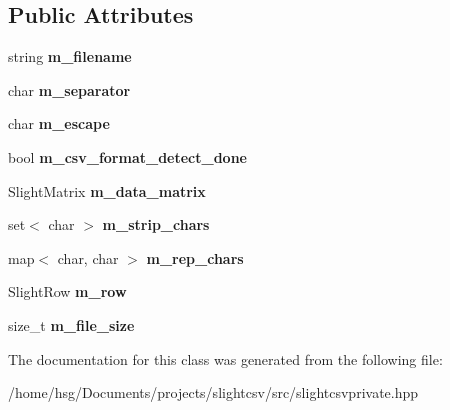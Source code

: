 \subsection*{Public Attributes}
\begin{DoxyCompactItemize}
\item 
\mbox{\label{classutils_1_1SlightCSVPrivate_a1ca95cf105a198d5198d201d6b5593fe}} 
string {\bfseries m\+\_\+filename}
\item 
\mbox{\label{classutils_1_1SlightCSVPrivate_a836ab9f1c58bf3efdb984f030035fbb4}} 
char {\bfseries m\+\_\+separator}
\item 
\mbox{\label{classutils_1_1SlightCSVPrivate_a51b4fad3286a164618d7390a727998a1}} 
char {\bfseries m\+\_\+escape}
\item 
\mbox{\label{classutils_1_1SlightCSVPrivate_acb8d8f3bcb5d902799d05583cf01c9c0}} 
bool {\bfseries m\+\_\+csv\+\_\+format\+\_\+detect\+\_\+done}
\item 
\mbox{\label{classutils_1_1SlightCSVPrivate_a493870cd6f6add7bd4488d10dd97f2dc}} 
Slight\+Matrix {\bfseries m\+\_\+data\+\_\+matrix}
\item 
\mbox{\label{classutils_1_1SlightCSVPrivate_a6f50ac7d188e7de0abb9bfbc5b541840}} 
set$<$ char $>$ {\bfseries m\+\_\+strip\+\_\+chars}
\item 
\mbox{\label{classutils_1_1SlightCSVPrivate_a7ccffa0f8479297780dc49316f3d447a}} 
map$<$ char, char $>$ {\bfseries m\+\_\+rep\+\_\+chars}
\item 
\mbox{\label{classutils_1_1SlightCSVPrivate_aa1734b01fd9826c41aaefa5df7367468}} 
Slight\+Row {\bfseries m\+\_\+row}
\item 
\mbox{\label{classutils_1_1SlightCSVPrivate_ab452b617c295b5cdbf5500fca94f622d}} 
size\+\_\+t {\bfseries m\+\_\+file\+\_\+size}
\end{DoxyCompactItemize}


The documentation for this class was generated from the following file\+:\begin{DoxyCompactItemize}
\item 
/home/hsg/\+Documents/projects/slightcsv/src/slightcsvprivate.\+hpp\end{DoxyCompactItemize}
